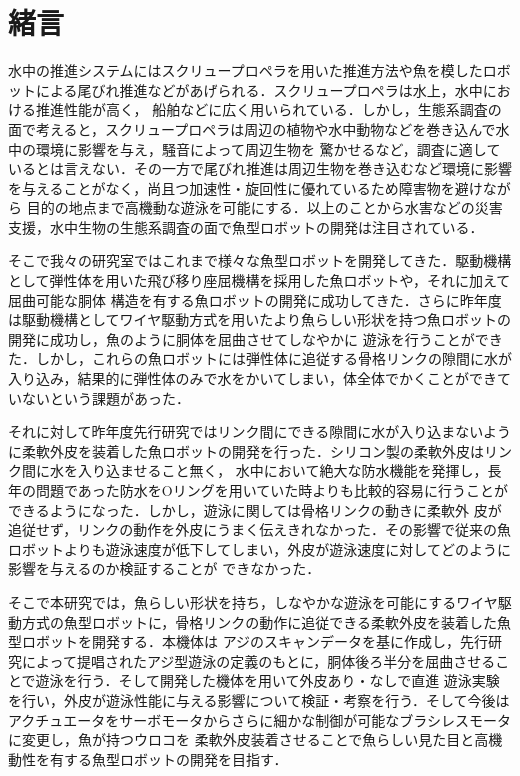 \newpage
\setcounter{page}{1}
\section{緒言}
水中の推進システムにはスクリュープロペラを用いた推進方法や魚を模したロボットによる尾びれ推進などがあげられる\cite{ichi}．スクリュープロペラは水上，水中における推進性能が高く，
船舶などに広く用いられている．しかし，生態系調査の面で考えると，スクリュープロペラは周辺の植物や水中動物などを巻き込んで水中の環境に影響を与え，騒音によって周辺生物を
驚かせるなど，調査に適しているとは言えない．その一方で尾びれ推進は周辺生物を巻き込むなど環境に影響を与えることがなく，尚且つ加速性・旋回性に優れているため障害物を避けながら
目的の地点まで高機動な遊泳を可能にする．以上のことから水害などの災害支援，水中生物の生態系調査の面で魚型ロボットの開発は注目されている\cite{ni}\cite{san}．

そこで我々の研究室ではこれまで様々な魚型ロボットを開発してきた．駆動機構として弾性体を用いた飛び移り座屈機構を採用した魚ロボット\cite{yon}\cite{go}や，それに加えて屈曲可能な胴体
構造を有する魚ロボット\cite{roku}\cite{nana}\cite{hachi}の開発に成功してきた．さらに昨年度は駆動機構としてワイヤ駆動方式を用いたより魚らしい形状を持つ魚ロボットの開発に成功し，魚のように胴体を屈曲させてしなやかに
遊泳を行うことができた．しかし，これらの魚ロボットには弾性体に追従する骨格リンクの隙間に水が入り込み，結果的に弾性体のみで水をかいてしまい，体全体でかくことができていないという課題があった．

それに対して昨年度先行研究\cite{kyu}ではリンク間にできる隙間に水が入り込まないように柔軟外皮を装着した魚ロボットの開発を行った．シリコン製の柔軟外皮はリンク間に水を入り込ませること無く，
水中において絶大な防水機能を発揮し，長年の問題であった防水をOリングを用いていた時よりも比較的容易に行うことができるようになった．しかし，遊泳に関しては骨格リンクの動きに柔軟外
皮が追従せず，リンクの動作を外皮にうまく伝えきれなかった．その影響で従来の魚ロボットよりも遊泳速度が低下してしまい，外皮が遊泳速度に対してどのように影響を与えるのか検証することが
できなかった．

そこで本研究では，魚らしい形状を持ち，しなやかな遊泳を可能にするワイヤ駆動方式の魚型ロボットに，骨格リンクの動作に追従できる柔軟外皮を装着した魚型ロボットを開発する．本機体は
アジのスキャンデータを基に作成し，先行研究によって提唱されたアジ型遊泳の定義のもとに，胴体後ろ半分を屈曲させることで遊泳を行う．そして開発した機体を用いて外皮あり・なしで直進
遊泳実験を行い，外皮が遊泳性能に与える影響について検証・考察を行う．そして今後はアクチュエータをサーボモータからさらに細かな制御が可能なブラシレスモータに変更し，魚が持つウロコを
柔軟外皮装着させることで魚らしい見た目と高機動性を有する魚型ロボットの開発を目指す．
